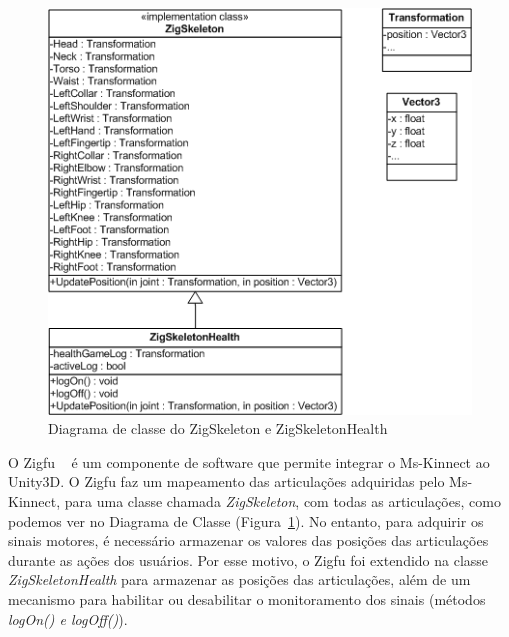 \begin{figure}[!h]
 \centering
 \includegraphics[scale=0.8]{./img/diagclasszigfu.png}
 \caption{Diagrama de classe do ZigSkeleton e ZigSkeletonHealth}
 \label{fig:diagramaclassezigfu}
\end{figure}

O Zigfu ~\cite{zigfu} é um componente de software que permite integrar o Ms-Kinnect ao Unity3D. O Zigfu faz um mapeamento das articulações adquiridas pelo Ms-Kinnect, para uma classe chamada \textit{ZigSkeleton}, com todas as articulações, como podemos ver no Diagrama de Classe (Figura~\ref{fig:diagramaclassezigfu}). No entanto, para adquirir os sinais motores, é necessário armazenar os valores das posições das articulações durante as ações dos usuários. Por esse motivo, o Zigfu foi extendido na classe \textit{ZigSkeletonHealth} para armazenar as posições das articulações, além de um mecanismo para habilitar ou desabilitar o monitoramento dos sinais (métodos \textit{logOn() e logOff()}).


